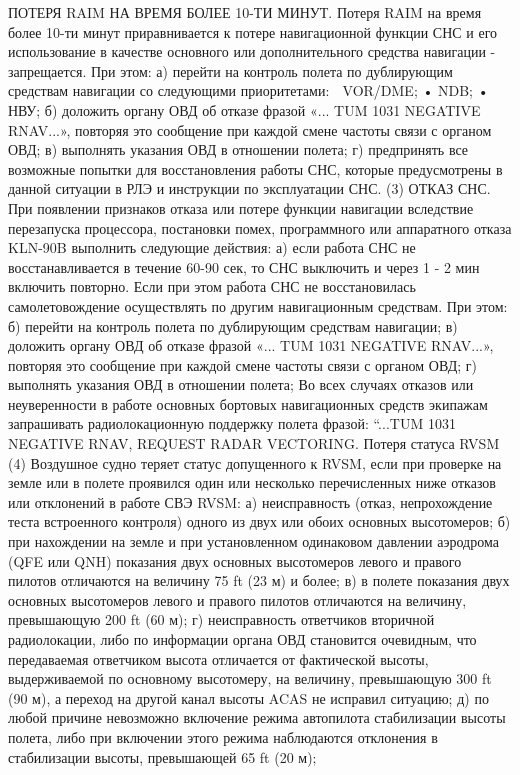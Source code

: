 ПОТЕРЯ RAIM НА ВРЕМЯ БОЛЕЕ 10-ТИ МИНУТ.
Потеря RAIM на время более 10-ти минут приравнивается к потере навигационной функции СНС и его использование в качестве основного или дополнительного средства навигации - запрещается.
При этом:
а)	перейти на контроль полета по дублирующим средствам навигации со следующими приоритетами:
	VOR/DME;
•	NDB;
•	НВУ;
б)	доложить органу ОВД об отказе фразой «... TUM 1031 NEGATIVE RNAV...», повторяя это сообщение при каждой смене частоты связи с органом ОВД; 
в)	выполнять указания ОВД в отношении полета;
г)	предпринять все возможные попытки для восстановления работы СНС, которые предусмотрены в данной ситуации в РЛЭ и инструкции по эксплуатации СНС.
(3) ОТКАЗ СНС.
При появлении признаков отказа или потере функции навигации вследствие перезапуска процессора, постановки помех, программного или аппаратного отказа KLN-90B выполнить следующие действия:
а)	если работа СНС не восстанавливается в течение 60-90 сек, то СНС выключить и через 1 - 2 мин включить повторно. Если при этом работа СНС не восстановилась самолетовождение осуществлять по другим навигационным средствам. 
При этом: 
б)	перейти на контроль полета по дублирующим средствам навигации; 
в)	доложить органу ОВД об отказе фразой «... TUM 1031 NEGATIVE RNAV...», повторяя это сообщение при каждой смене частоты связи с органом ОВД;
г)	выполнять указания ОВД в отношении полета;
Во всех случаях отказов или неуверенности в работе основных бортовых навигационных средств экипажам запрашивать радиолокационную поддержку полета фразой: “...TUM 1031 NEGATIVE RNAV, REQUEST RADAR VECTORING.
Потеря статуса RVSM
(4) Воздушное судно теряет статус допущенного к RVSM, если при проверке на земле или в полете проявился один или несколько перечисленных ниже отказов или отклонений в работе СВЭ RVSM:
а)	неисправность (отказ, непрохождение теста встроенного контроля) одного из двух или обоих основных высотомеров;
б)	при нахождении на земле и при установленном одинаковом давлении аэродрома (QFE или QNH) показания двух основных высотомеров левого и правого пилотов отличаются на величину 75 ft (23 м) и более;
в)	в полете показания двух основных высотомеров левого и правого пилотов отличаются на величину, превышающую 200 ft (60 м);
г)	неисправность ответчиков вторичной радиолокации, либо по информации органа ОВД становится очевидным, что передаваемая ответчиком высота отличается от фактической высоты, выдерживаемой по основному высотомеру, на величину, превышающую 300 ft (90 м), а переход на другой канал высоты ACAS не исправил ситуацию;
д)	по любой причине невозможно включение режима автопилота стабилизации высоты полета, либо при включении этого режима наблюдаются отклонения в стабилизации высоты, превышающей 65 ft (20 м);
